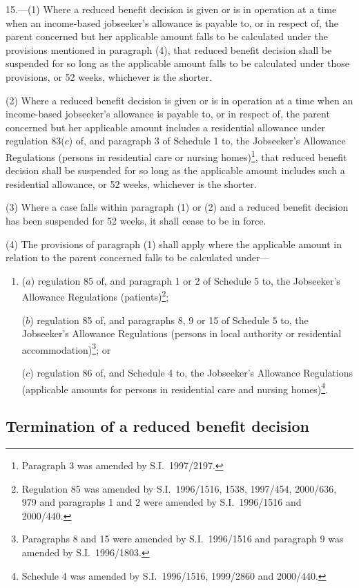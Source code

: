 \documentclass[12pt,a4paper]{article}
\begin{document}
15.---(1)  Where a reduced benefit decision is given or is in operation at a time when an income-based jobseeker’s allowance is payable to, or in respect of, the parent concerned but her applicable amount falls to be calculated under the provisions mentioned in paragraph (4), that reduced benefit decision shall be suspended for so long as the applicable amount falls to be calculated under those provisions, or 52 weeks, whichever is the shorter.

(2) Where a reduced benefit decision is given or is in operation at a time when an income-based jobseeker’s allowance is payable to, or in respect of, the parent concerned but her applicable amount includes a residential allowance under regulation 83($c$)  of, and paragraph 3 of Schedule 1 to, the Jobseeker’s Allowance Regulations (persons in residential care or nursing homes)\footnote{Paragraph 3 was amended by S.I.\ 1997/2197.}, that reduced benefit decision shall be suspended for so long as the applicable amount includes such a residential allowance, or 52 weeks, whichever is the shorter.

(3) Where a case falls within paragraph (1) or (2) and a reduced benefit decision has been suspended for 52 weeks, it shall cease to be in force.

(4) The provisions of paragraph (1) shall apply where the applicable amount in relation to the parent concerned falls to be calculated under—
\begin{enumerate}\item[]
($a$) regulation 85 of, and paragraph 1 or 2 of Schedule 5 to, the Jobseeker’s Allowance Regulations (patients)\footnote{Regulation 85 was amended by S.I.\ 1996/1516, 1538, 1997/454, 2000/636, 979 and paragraphs 1 and 2 were amended by S.I.\ 1996/1516 and 2000/440.};

($b$) regulation 85 of, and paragraphs 8, 9 or 15 of Schedule 5 to, the Jobseeker’s Allowance Regulations (persons in local authority or residential accommodation)\footnote{Paragraphs 8 and 15 were amended by S.I.\ 1996/1516 and paragraph 9 was amended by S.I.\ 1996/1803.}; or

($c$) regulation 86 of, and Schedule 4 to, the Jobseeker’s Allowance Regulations (applicable amounts for persons in residential care and nursing homes)\footnote{Schedule 4 was amended by S.I.\ 1996/1516, 1999/2860 and 2000/440.}.
\end{enumerate}

\subsection[16. Termination of a reduced benefit decision]{Termination of a reduced benefit decision}
\end{document}

